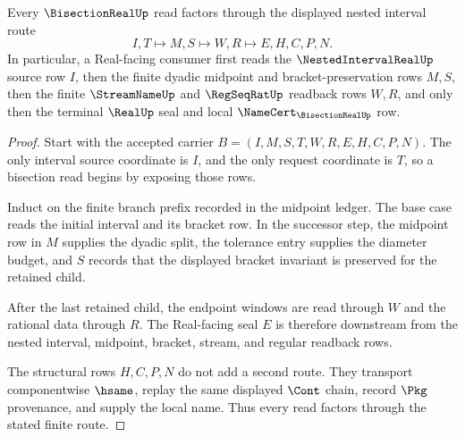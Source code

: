 \begin{theorem}
\label{thm:bisection-real-nested-interval-factorization}
Every $\BisectionRealUp$ read factors through the displayed nested interval route
$$
I,T \longmapsto M,S \longmapsto W,R \longmapsto E,H,C,P,N .
$$
In particular, a Real-facing consumer first reads the $\NestedIntervalRealUp$ source row $I$, then the finite dyadic midpoint and bracket-preservation rows $M,S$, then the finite $\StreamNameUp$ and $\RegSeqRatUp$ readback rows $W,R$, and only then the terminal $\RealUp$ seal and local $\NameCert_{\BisectionRealUp}$ row.
\end{theorem}
\begin{proof}
Start with the accepted carrier $B=(I,M,S,T,W,R,E,H,C,P,N)$. The only interval source coordinate is $I$, and the only request coordinate is $T$, so a bisection read begins by exposing those rows.

Induct on the finite branch prefix recorded in the midpoint ledger. The base case reads the initial interval and its bracket row. In the successor step, the midpoint row in $M$ supplies the dyadic split, the tolerance entry supplies the diameter budget, and $S$ records that the displayed bracket invariant is preserved for the retained child.

After the last retained child, the endpoint windows are read through $W$ and the rational data through $R$. The Real-facing seal $E$ is therefore downstream from the nested interval, midpoint, bracket, stream, and regular readback rows.

The structural rows $H,C,P,N$ do not add a second route. They transport componentwise $\hsame$, replay the same displayed $\Cont$ chain, record $\Pkg$ provenance, and supply the local name. Thus every read factors through the stated finite route.
\end{proof}

